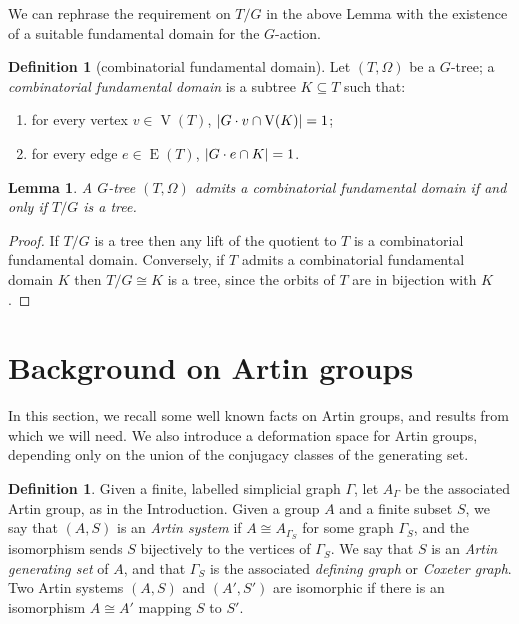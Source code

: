 \documentclass[svgnames]{amsart}
\theoremstyle{plain}
\newtheorem{lemma}[thm]{Lemma}
\theoremstyle{definition}
\newtheorem{defn}[thm]{Definition}
\DeclarePairedDelimiter{\abs}{\lvert}{\rvert}
\newcommand{\edge}[1]{\operatorname{E}(#1)}
\newcommand{\ver}[1]{\operatorname{V}(#1)}
\begin{document}
We can rephrase the requirement on $T/G$ in the above Lemma with the existence of a suitable fundamental domain for the $G$-action.
\begin{defn}[combinatorial fundamental domain]\label{defn:combfunddom}
    Let $(T,\Omega)$ be a $G$-tree; a \emph{combinatorial fundamental domain} is a subtree $K\subseteq T$ such that:
    \begin{enumerate}
        \item for every vertex $v\in\ver T$, $\abs{G\cdot v\cap \ver K}=1$;
        \item for every edge $e\in \edge T$, $\abs{G\cdot e\cap K}=1$.
    \end{enumerate}
\end{defn}

\begin{lemma}\label{lem:cfdTreeQuotient}
    A $G$-tree $(T, \Omega)$ admits a combinatorial fundamental domain if and only if $T/G$ is a tree.
\end{lemma}
\begin{proof}
    If $T/G$ is a tree then any lift of the quotient to $T$ is a combinatorial fundamental domain. Conversely, if $T$ admits a combinatorial fundamental domain $K$ then $T/G\cong K$ is a tree, since the orbits of $T$ are in bijection with $K$.
\end{proof}


\section{Background on Artin groups}\label{sec:cyclicsplit}
In this section, we recall some well known facts on Artin groups, and results from \cite{JonManSar_JSJSpl} which we will need. We also introduce a deformation space for Artin groups, depending only on the union of the conjugacy classes of the generating set. \par 

\begin{defn}\label{defn:artin}
Given a finite, labelled simplicial graph $\Gamma$, let $A_\Gamma$ be the associated Artin group, as in the Introduction. Given a group $A$ and a finite subset $S$, we say that $(A,S)$ is an \emph{Artin system} if $A \cong A_{\Gamma_S}$ for some graph $\Gamma_S$, and the isomorphism sends $S$ bijectively to the vertices of $\Gamma_S$. We say that $S$ is an \emph{Artin generating set} of $A$, and that $\Gamma_S$ is the associated \emph{defining graph} or \emph{Coxeter graph}. Two Artin systems $(A,S)$ and $(A',S')$ are isomorphic if there is an isomorphism $A\cong A'$ mapping $S$ to $S'$. 
\end{defn}
\end{document}
